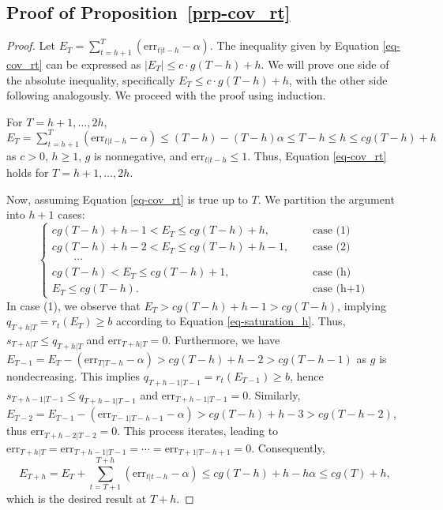 \documentclass[
  11pt,
  12pt]{article}
\theoremstyle{plain}
\theoremstyle{remark}
\begin{document}
\subsection{\texorpdfstring{Proof of
Proposition~\ref{prp-cov_rt}}{Proof of Proposition~}}\label{sec-proof_cov_rt}

\begin{proof}
Let \(E_T=\sum_{t=h+1}^{T}(\mathrm{err}_{t|t-h}-\alpha)\). The
inequality given by Equation \eqref{eq-cov_rt} can be expressed as
\(|E_T| \leq c \cdot g(T-h) + h\). We will prove one side of the
absolute inequality, specifically \(E_T \leq c \cdot g(T-h) + h\), with
the other side following analogously. We proceed with the proof using
induction.

For \(T=h+1,\ldots,2h\),
\(E_T = \sum_{t=h+1}^{T}(\mathrm{err}_{t|t-h}-\alpha) \leq (T-h)-(T-h)\alpha \leq T-h \leq h \leq cg(T-h) + h\)
as \(c>0\), \(h\geq 1\), \(g\) is nonnegative, and
\(\mathrm{err}_{t|t-h} \leq 1\). Thus, Equation \eqref{eq-cov_rt} holds
for \(T=h+1,\ldots,2h\).

Now, assuming Equation \eqref{eq-cov_rt} is true up to \(T\). We
partition the argument into \(h+1\) cases: \[
\begin{cases}
cg(T-h)+h-1 < E_T \leq cg(T-h)+h, & \quad \text { case (1) } \\
cg(T-h)+h-2 < E_T \leq cg(T-h)+h-1, & \quad \text { case (2) } \\
\qquad \cdots \\
cg(T-h) < E_T \leq cg(T-h)+1, & \quad \text { case (h) } \\
E_T \leq cg(T-h). & \quad \text { case (h+1) }
\end{cases}
\] In case (1), we observe that \(E_T > cg(T-h)+h-1 > cg(T-h)\),
implying \(q_{T+h|T} = r_t(E_{T}) \geq b\) according to Equation
\eqref{eq-saturation_h}. Thus, \(s_{T+h|T} \leq q_{T+h|T}\) and
\(\mathrm{err}_{T+h|T} = 0\). Furthermore, we have
\(E_{T-1} = E_T - (\mathrm{err}_{T|T-h} - \alpha) > cg(T-h)+h-2 > cg(T-h-1)\)
as \(g\) is nondecreasing. This implies
\(q_{T+h-1|T-1} = r_t(E_{T-1}) \geq b\), hence
\(s_{T+h-1|T-1} \leq q_{T+h-1|T-1}\) and
\(\mathrm{err}_{T+h-1|T-1} = 0\). Similarly,
\(E_{T-2} = E_{T-1} - (\mathrm{err}_{T-1|T-h-1} - \alpha) > cg(T-h)+h-3 > cg(T-h-2)\),
thus \(\mathrm{err}_{T+h-2|T-2} = 0\). This process iterates, leading to
\(\mathrm{err}_{T+h|T} = \mathrm{err}_{T+h-1|T-1} = \cdots = \mathrm{err}_{T+1|T-h+1} = 0\).
Consequently, \[
E_{T+h} = E_T+\sum_{t=T+1}^{T+h}(\mathrm{err}_{t|t-h}-\alpha) \leq cg(T-h)+h-h\alpha \leq cg(T)+h,
\] which is the desired result at \(T+h\).


\end{proof}
\end{document}
